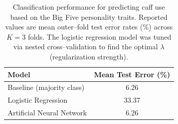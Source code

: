 
\begin{table}[H]
    \centering
    \caption{Classification performance for predicting caff use based on the Big Five personality traits.
    Reported values are mean outer–fold test error rates (\%) across $K = 3$ folds.
    The logistic regression model was tuned via nested cross–validation to find the optimal $\lambda$ (regularization strength).}
    \label{tab:classification:caff}
    \begin{tabular}{l c}
        \toprule
        \textbf{Model} & \textbf{Mean Test Error (\%)} \\
        \midrule
        Baseline (majority class) & 6.26 \\
        Logistic Regression & 33.37 \\
        Artificial Neural Network & 6.26 \\
        \bottomrule
    \end{tabular}
\end{table}
